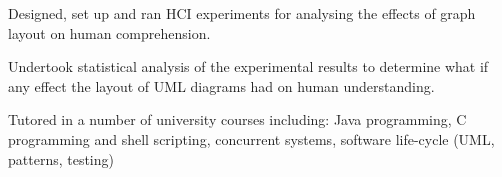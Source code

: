 \documentclass[a4paper]{awesome-deedy}
\begin{document}
\begin{minipage}[t]{0.66\textwidth}
\begin{tightemize}
\item Designed, set up and ran HCI experiments for analysing the effects of graph layout on human comprehension.
\item Undertook statistical analysis of the experimental results to determine what if any effect the layout of UML diagrams had on human understanding.
\end{tightemize}
\sectionsep

\begin{tightemize}
\item Tutored in a number of university courses including: Java programming, C programming and shell scripting, concurrent systems, software life-cycle (UML, patterns, testing)
\end{tightemize}
\sectionsep





\end{minipage}
\end{document}
